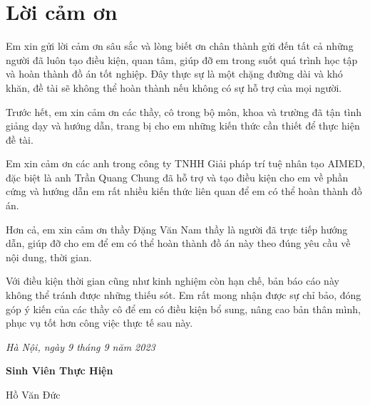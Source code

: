 \section*{\Large\selectfont\centering Lời cảm ơn}

Em xin gửi lời cảm ơn sâu sắc và lòng biết ơn chân thành gửi đến tất cả những người đã luôn tạo điều kiện, quan tâm, giúp đỡ em trong suốt quá trình học tập và hoàn thành đồ án tốt nghiệp. Đây thực sự là một chặng đường dài và khó khăn, đề tài sẽ không thể hoàn thành nếu không có sự hỗ trợ của mọi người.

Trước hết, em xin cảm ơn các thầy, cô trong bộ môn, khoa và trường đã tận tình giảng dạy và hướng dẫn, trang bị cho em những kiến thức cần thiết để thực hiện đề tài.

Em xin cảm ơn các anh trong công ty TNHH Giải pháp trí tuệ nhân tạo AIMED, đặc biệt là anh Trần Quang Chung đã hỗ trợ và tạo điều kiện cho em về phần cứng và hướng dẫn em rất nhiều kiến thức liên quan để em có thể hoàn thành đồ án.

Hơn cả, em xin cảm ơn thầy Đặng Văn Nam thầy là người đã trực tiếp hướng dẫn, giúp đỡ cho em để em có thể hoàn thành đồ án này theo đúng yêu cầu về nội dung, thời gian.

Với điều kiện thời gian cũng như kinh nghiệm còn hạn chế, bản báo cáo này không thể tránh được những thiếu sót. Em rất mong nhận được sự chỉ bảo, đóng góp ý kiến của các thầy cô để em có điều kiện bổ sung, nâng cao bản thân mình, phục vụ tốt hơn công việc thực tế sau này.

\begin{flushright}
    \textit{Hà Nội, ngày 9 tháng 9 năm 2023}

    \textbf{Sinh Viên Thực Hiện}

    Hồ Văn Đức
\end{flushright}